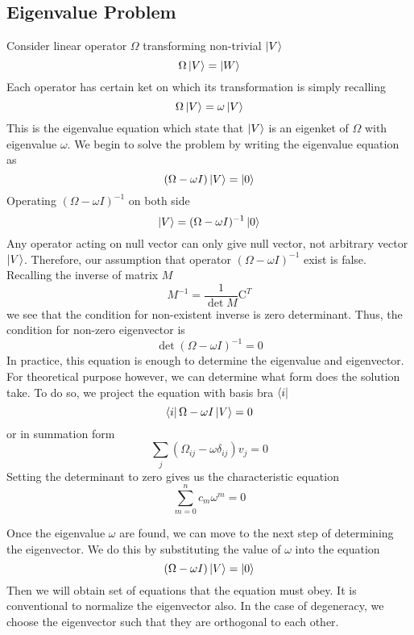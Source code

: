 \documentclass[../main.tex]{subfiles}
\begin{document}
\subsection{Eigenvalue Problem}
Consider linear operator $\Omega$ transforming non-trivial $\ket{V}$
\begin{equation*}
	\Omega 	\ket{V}=\ket{W}
\end{equation*}
Each operator has certain ket on which its transformation is simply recalling
\begin{equation*}
	\Omega \ket{V}=\omega \ket{V}
\end{equation*}
This is the eigenvalue equation which state that $\ket{V}$ is an eigenket of $\Omega$ with eigenvalue $\omega$.
We begin to solve the problem by writing the eigenvalue equation as
\begin{equation*}
	(\Omega-\omega I)\ket{V}=\ket{0}
\end{equation*}
Operating $(\Omega-\omega I)^{-1}$ on both side
\begin{equation*}
	\ket{V}=(\Omega-\omega I)^{-1}\ket{0}
\end{equation*}
Any operator acting on null vector can only give null vector, not arbitrary vector $\ket{V}$.
Therefore, our assumption that operator $(\Omega-\omega I)^{-1}$ exist is false.
Recalling the inverse of matrix $M$
\begin{equation*}
	M^{-1}=\frac{1}{\det M}\text{C}^T
\end{equation*}
we see that the condition for non-existent inverse is zero determinant.
Thus, the condition for non-zero eigenvector is
\begin{equation*}
	\det (\Omega-\omega I)^{-1}=0
\end{equation*}
In practice, this equation is enough to determine the eigenvalue and eigenvector.
For theoretical purpose however, we can determine what form does the solution take.
To do so, we project the equation with basis bra $\bra{i}$
\begin{equation*}
	\bra{i}\Omega-\omega I\ket{V}=0
\end{equation*}
or in summation form
\begin{equation*}
	\sum_j (\Omega_{ij}-\omega\delta_{ij})v_j=0
\end{equation*}
Setting the determinant to zero gives us the characteristic equation
\begin{equation*}
	\sum_{m=0}^{n}c_m\omega^{m}=0
\end{equation*}

Once the eigenvalue $\omega$ are found, we can move to the next step of determining the eigenvector.
We do this by substituting the value of $\omega$ into the equation
\begin{equation*}
	(\Omega-\omega I)\ket{V}=\ket{0}
\end{equation*}
Then we will obtain set of equations that the equation must obey.
It is conventional to normalize the eigenvector also.
In the case of degeneracy, we choose the eigenvector such that they are orthogonal to each other.
\end{document}
